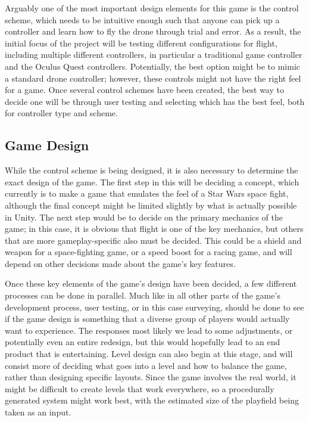 \documentclass[10pt,twocolumn]{article}
\begin{document}
Arguably one of the most important design elements for this game is the control scheme, which needs to be intuitive enough such that anyone can pick up a controller and learn how to fly the drone through trial and error. As a result, the initial focus of the project will be testing different configurations for flight, including multiple different controllers, in particular a traditional game controller and the Oculus Quest controllers. Potentially, the best option might be to mimic a standard drone controller; however, these controls might not have the right feel for a game. Once several control schemes have been created, the best way to decide one will be through user testing and selecting which has the best feel, both for controller type and scheme.

\subsection{Game Design}
While the control scheme is being designed, it is also necessary to determine the exact design of the game. The first step in this will be deciding a concept, which currently is to make a game that emulates the feel of a Star Wars space fight, although the final concept might be limited slightly by what is actually possible in Unity. The next step would be to decide on the primary mechanics of the game; in this case, it is obvious that flight is one of the key mechanics, but others that are more gameplay-specific also must be decided. This could be a shield and weapon for a space-fighting game, or a speed boost for a racing game, and will depend on other decisions made about the game's key features. 

Once these key elements of the game's design have been decided, a few different processes can be done in parallel. Much like in all other parts of the game's development process, user testing, or in this case surveying, should be done to see if the game design is something that a diverse group of players would actually want to experience. The responses most likely we lead to some adjustments, or potentially even an entire redesign, but this would hopefully lead to an end product that is entertaining. Level design can also begin at this stage, and will consist more of deciding what goes into a level and how to balance the game, rather than designing specific layouts. Since the game involves the real world, it might be difficult to create levels that work everywhere, so a procedurally generated system might work best, with the estimated size of the playfield being taken as an input. 
\end{document}
